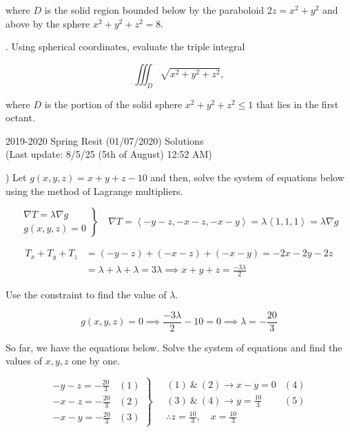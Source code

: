 \documentclass{article}
\begin{document}
\hfill

\noindent where $D$ is the solid region bounded below by the paraboloid $2z=x^2+y^2$ and above by the sphere $x^2+y^2+z^2=8$.

\hfill

. Using spherical coordinates, evaluate the triple integral

\[\iiint_D\sqrt{x^2+y^2+z^2},\]

\hfill

\noindent where $D$ is the portion of the solid sphere $x^2+y^2+z^2\leq1$ that lies in the first octant.

\newpage

\begin{center}
2019-2020 Spring Resit (01/07/2020) Solutions\\
(Last update: 8/5/25 (5th of August) 12:52 AM)
\end{center}

) Let $g(x,y,z)=x+y+z-10$ and then, solve the system of equations below using the method of Lagrange multipliers.

\[
\left.
\begin{array}{ll}
\displaystyle\nabla T =\lambda \nabla g\\
\displaystyle g(x,y,z) = 0
\end{array}
\right\}\quad
\nabla T = \left\langle-y-z,-x-z,-x-y\right\rangle=\lambda\left\langle1,1,1\right\rangle= \lambda\nabla g
\]

\begin{align*}T_x+T_y + T_z&=(-y-z) +(-x-z) +(-x-y)=-2x-2y-2z\\&=\lambda+\lambda+\lambda=3\lambda\implies x+y+z=\frac{-3\lambda}{2}\end{align*}

\hfill

\noindent Use the constraint to find the value of $\lambda$.

\[g(x,y,z) = 0 \implies \frac{-3\lambda}{2}-10=0\implies \lambda=-\frac{20}{3}\]

\hfill

\noindent So far, we have the equations below. Solve the system of equations and find the values of $x,y,z$ one by one.

\[
\left.
\begin{array}{ll}
\displaystyle -y-z=-\frac{20}{3}&(1)\\[0.5cm]
\displaystyle -x-z=-\frac{20}{3}&(2)\\[0.5cm]
\displaystyle -x-y=-\frac{20}{3}&(3)
\end{array}
\right\}\quad
\begin{array}{ll}
\displaystyle (1)\:\&\:(2)\rightarrow x-y=0 & (4) \\[0.2cm]
\displaystyle (3)\:\&\:(4)\rightarrow y=\frac{10}{3}&(5)\\[0.5cm]
\displaystyle\therefore z=\frac{10}{3},\quad x=\frac{10}{3}
\end{array}
\]
\end{document}
